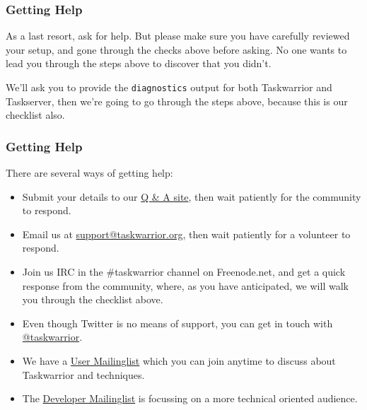 \documentclass[t,handout]{beamer}
\begin{document}
\begin{frame}[fragile]\frametitle{Getting Help}
    \vfill
    As a last resort, ask for help. But please make sure you have carefully reviewed your setup, and gone through the checks above before asking. No one wants to lead you through the steps above to discover that you didn't.

    We'll ask you to provide the \verb+diagnostics+ output for both Taskwarrior and Taskserver, then we're going to go through the steps above, because this is our checklist also.
\end{frame}

\begin{frame}[fragile]\frametitle{Getting Help}
    \vfill
    There are several ways of getting help:

    \begin{itemize}
        \item Submit your details to our \href{https://answers.tasktools.org}{Q \& A site}, then wait patiently for the community to respond.
        \item Email us at \href{mailto:support@taskwarrior.org}{support@taskwarrior.org}, then wait patiently for a volunteer to respond.
        \item Join us IRC in the \#taskwarrior channel on Freenode.net, and get a quick response from the community, where, as you have anticipated, we will walk you through the checklist above.
        \item Even though Twitter is no means of support, you can get in touch with \href{https://twitter.com/taskwarrior}{@taskwarrior}.
        \item We have a \href{https://groups.google.com/forum/\#!forum/taskwarrior-user}{User Mailinglist} which you can join anytime to discuss about Taskwarrior and techniques.
        \item The \href{https://groups.google.com/forum/\#!forum/taskwarrior-dev}{Developer Mailinglist} is focussing on a more technical oriented audience.
    \end{itemize}

\end{frame}

\end{document}
